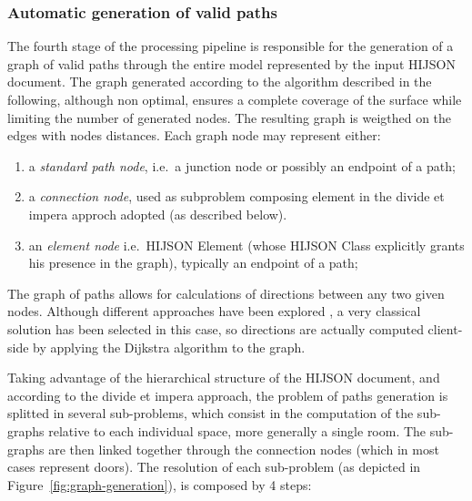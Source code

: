 \subsubsection{Automatic generation of valid paths}\label{algorithmics-automatic-generation-of-valid-paths}\label{sec:paths}

The fourth stage of the processing pipeline is responsible for the
generation of a graph of valid paths through the entire model
represented by the input HIJSON document. The graph generated according
to the algorithm described in the following, although non optimal,
ensures a complete coverage of the surface while limiting the number of
generated nodes. The resulting graph is weigthed on the edges with nodes
distances. Each graph node may represent either:

\begin{enumerate}
\def\labelenumi{\alph{enumi}.}
\itemsep1pt\parskip0pt
\item
 a \emph{standard path node}, i.e.~a junction node or possibly an endpoint of a
 path;
\item
 a \emph{connection node}, used as subproblem composing element in the divide et
 impera approch adopted (as described below).
\item
an \emph{element node} i.e.~HIJSON Element (whose HIJSON Class explicitly grants
 his presence in the graph), typically an endpoint of a path;
\end{enumerate}

The graph of paths allows for calculations of directions between any two given
nodes. Although different approaches have been explored \cite{6999103}, 
a very classical solution has been selected in this case, so directions 
are actually computed client-side by applying the Dijkstra algorithm to the graph. 

Taking advantage of the hierarchical structure of the HIJSON document,
and according to the divide et impera approach, the problem of 
paths generation is splitted in several sub-problems, which consist in
the computation of the sub-graphs relative to each individual space, more generally a single room. The sub-graphs are then linked together through the
connection nodes (which in most cases represent doors). The resolution
of each sub-problem (as depicted in Figure~\ref{fig:graph-generation}), 
is composed by 4 steps:

